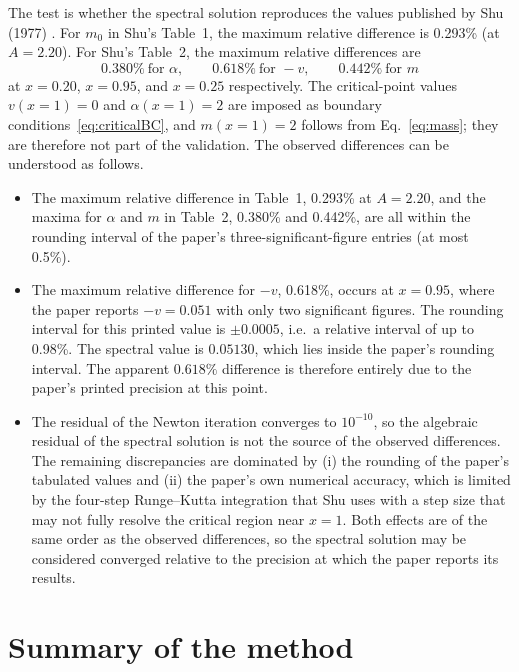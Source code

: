 \documentclass[11pt,a4paper]{article}
\begin{document}
The test is whether the spectral solution reproduces the values
published by Shu (1977) \cite{shu1977}. For $m_0$ in Shu's Table~1, the
maximum relative difference is 0.293\% (at $A=2.20$). For Shu's Table~2,
the maximum relative differences are
\[
0.380\% \ \text{for }\alpha,
\qquad
0.618\% \ \text{for }-v,
\qquad
0.442\% \ \text{for }m
\]
at $x=0.20$, $x=0.95$, and $x=0.25$ respectively.
The critical-point values $v(x{=}1)=0$ and $\alpha(x{=}1)=2$ are imposed
as boundary conditions~\eqref{eq:criticalBC}, and $m(x{=}1)=2$ follows
from Eq.~\eqref{eq:mass}; they are therefore not part of the validation.
The observed differences can be understood as follows.

\begin{itemize}
\item The maximum relative difference in Table~1, 0.293\% at
      $A=2.20$, and the maxima for $\alpha$ and $m$ in Table~2,
      0.380\% and 0.442\%, are all within the rounding interval of the
      paper's three-significant-figure entries (at most 0.5\%).
\item The maximum relative difference for $-v$, 0.618\%, occurs at
      $x=0.95$, where the paper reports $-v=0.051$ with only two
      significant figures. The rounding interval for this printed
      value is $\pm 0.0005$, i.e.\ a relative interval of up to
      0.98\%. The spectral value is $0.05130$, which lies inside the
      paper's rounding interval. The apparent $0.618\%$ difference is
      therefore entirely due to the paper's printed precision at this
      point.
\item The residual of the Newton iteration converges to $10^{-10}$, so
      the algebraic residual of the spectral solution is not the source
      of the observed differences. The remaining discrepancies are
      dominated by (i) the rounding of the paper's tabulated values and
      (ii) the paper's own numerical accuracy, which is limited by the
      four-step Runge--Kutta integration that Shu uses with a step size
      that may not fully resolve the critical region near $x=1$. Both
      effects are of the same order as the observed differences, so the
      spectral solution may be considered converged relative to the
      precision at which the paper reports its results.
\end{itemize}

\section{Summary of the method}
\label{sec:summary}
\end{document}
